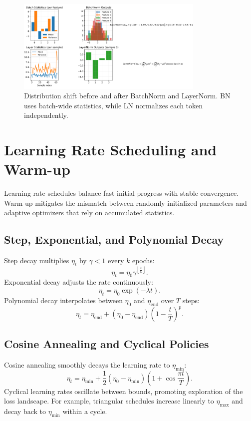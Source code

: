 \documentclass{article}
\begin{document}
\begin{figure}[H]
  \centering
  \includegraphics[width=0.8\textwidth]{normalization_comparison.png}
  \caption{Distribution shift before and after BatchNorm and LayerNorm. BN uses batch-wide statistics, while LN normalizes each token independently.}
  \label{fig:normalization_comparison}
\end{figure}
\FloatBarrier

\section{Learning Rate Scheduling and Warm-up}
Learning rate schedules balance fast initial progress with stable convergence. Warm-up mitigates the mismatch between randomly initialized parameters and adaptive optimizers that rely on accumulated statistics.

\subsection{Step, Exponential, and Polynomial Decay}
Step decay multiplies $\eta_t$ by $\gamma < 1$ every $k$ epochs:
\begin{equation}
  \eta_t = \eta_0 \gamma^{\left\lfloor \frac{t}{k} \right\rfloor}.
\end{equation}
Exponential decay adjusts the rate continuously:
\begin{equation}
  \eta_t = \eta_0 \exp(-\lambda t).
\end{equation}
Polynomial decay interpolates between $\eta_0$ and $\eta_{\mathrm{end}}$ over $T$ steps:
\begin{equation}
  \eta_t = \eta_{\mathrm{end}} + (\eta_0 - \eta_{\mathrm{end}}) \left(1 - \frac{t}{T}\right)^{p}.
\end{equation}

\subsection{Cosine Annealing and Cyclical Policies}
Cosine annealing smoothly decays the learning rate to $\eta_{\min}$:
\begin{equation}
  \eta_t = \eta_{\min} + \frac{1}{2} (\eta_0 - \eta_{\min}) \left(1 + \cos\frac{\pi t}{T}\right).
\end{equation}
Cyclical learning rates oscillate between bounds, promoting exploration of the loss landscape. For example, triangular schedules increase linearly to $\eta_{\max}$ and decay back to $\eta_{\min}$ within a cycle.
\end{document}

